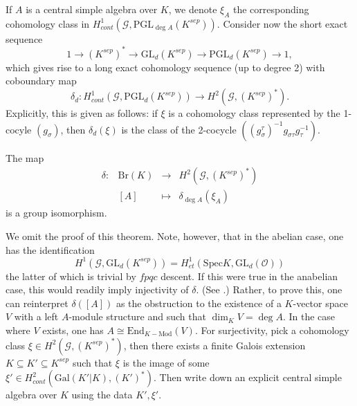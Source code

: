 If $A$ is a central simple algebra over $K$, we denote $\xi_A$ the corresponding cohomology class in $H_{cont}^1 (\mathcal{G}, \text{PGL}_{\deg A}(K^{sep}))$. Consider now the short exact sequence 
$$
1 \to (K^{sep})^* \to \text{GL}_d(K^{sep}) \to \text{PGL}_d(K^{sep}) \to 1,
$$
 which gives rise to a long exact cohomology sequence (up to degree 2) with coboundary map 
 $$
 \delta_d : H_{cont} ^1(\mathcal{G}, \text{PGL}_d(K^{sep})) \to H^2 (\mathcal{G}, (K^{sep})^*).
 $$ 
Explicitly, this is given as follows: if $\xi$ is a cohomology class represented by the 1-cocyle $(g_\sigma)$, then $\delta_d(\xi)$ is the class of the 2-cocycle $((g_\sigma^\tau)^{-1} g_{\sigma \tau} g_\tau^{-1})$. 

\begin{theorem} \label{thm:BrauerDelta}
The map
$$
\begin{array}{rrcl}
\delta : & \text{Br}(K) &  \longrightarrow & H^2(\mathcal{G}, (K^{sep})^*) \\
& [A] & \longmapsto & \delta_{\deg A} (\xi_A)
\end{array}
$$
is a group isomorphism.
\end{theorem}

We omit the proof of this theorem. Note, however, that in the abelian case, one has the identification
$$
H^1 (\mathcal{G}, \text{GL}_d(K^{sep})) = H_{et}^1 (\text{Spec} K, \text{GL}_d(\mathcal{O}))
$$
the latter of which is trivial by $fpqc$ descent. If this were true in the anabelian case, this would readily imply injectivity of $\delta$. (See \cite{SGA4.5}.) Rather, to prove this, one can reinterpret $\delta([A])$ as the obstruction to the existence of a $K$-vector space $V$ with a left $A$-module structure and such that $\dim_K V = \deg A$. In the case where $V$ exists, one has $A \cong \text{End}_{K-\text{Mod}} (V)$. For surjectivity, pick a cohomology class $\xi \in H^2(\mathcal{G}, (K^{sep})^*)$, then there exists a finite Galois extension $K \subseteq K' \subseteq K^{sep}$ such that $\xi$ is the image of some $\xi' \in H_{cont}^2(\text{Gal}(K'|K), (K')^*)$. Then write down an explicit central simple algebra over $K$ using the data $K', \xi'$.

